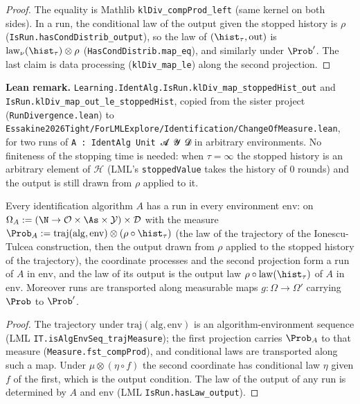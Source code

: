 \begin{proof}
\leanok
The equality is Mathlib \texttt{klDiv\_compProd\_left} (same kernel on both sides). In a run,
the conditional law of the output given the stopped history is $\rho$
(\texttt{IsRun.hasCondDistrib\_output}), so the law of $(\hist_\tau, \mathrm{out})$ is
$\mathrm{law}_\nu(\hist_\tau)\otimes\rho$ (\texttt{HasCondDistrib.map\_eq}), and similarly under
$\Prob'$. The last claim is data processing (\texttt{klDiv\_map\_le}) along the second
projection.
\end{proof}

\textbf{Lean remark.} \texttt{Learning.IdentAlg.IsRun.klDiv\_map\_stoppedHist\_out} and
\texttt{IsRun.klDiv\_map\_out\_le\_stoppedHist}, copied from the sister project
(\texttt{RunDivergence.lean}) to
\texttt{Essakine2026Tight/ForLMLExplore/Identification/ChangeOfMeasure.lean}, for two
runs of \texttt{A : IdentAlg Unit 𝓐 𝓨 𝓓} in arbitrary environments. No finiteness of the stopping
time is needed: when $\tau = \infty$ the stopped history is an arbitrary element of $\mathcal H$
(LML's \texttt{stoppedValue} takes the history of $0$ rounds) and the output is still drawn from
$\rho$ applied to it.

\begin{lemma}\label{lem:pinfo_canonical_run}
\leanok
Every identification algorithm $A$ has a run in every environment $\mathrm{env}$: on
$\Omega_A := (\N \to \mathcal O \times \As \times \mathcal Y) \times \mathcal D$ with the measure
$\Prob_A := \mathrm{traj}(\mathrm{alg}, \mathrm{env}) \otimes (\rho \circ \hist_\tau)$ (the law of
the trajectory of the Ionescu-Tulcea construction, then the output drawn from $\rho$ applied to
the stopped history of the trajectory), the coordinate processes and the second projection form a
run of $A$ in $\mathrm{env}$, and the law of its output is the output law
$\rho \circ \mathrm{law}(\hist_\tau)$ of $A$ in $\mathrm{env}$. Moreover runs are transported along
measurable maps $g : \Omega \to \Omega'$ carrying $\Prob$ to $\Prob'$.
\end{lemma}

\begin{proof}
\leanok
The trajectory under $\mathrm{traj}(\mathrm{alg}, \mathrm{env})$ is an algorithm-environment
sequence (LML \texttt{IT.isAlgEnvSeq\_trajMeasure}); the first projection carries $\Prob_A$ to that
measure (\texttt{Measure.fst\_compProd}), and conditional laws are transported along such a map.
Under $\mu \otimes (\eta\circ f)$ the second coordinate has conditional law $\eta$ given $f$ of the
first, which is the output condition. The law of the output of any run is determined by $A$ and
$\mathrm{env}$ (LML \texttt{IsRun.hasLaw\_output}).
\end{proof}

